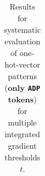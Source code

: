 \begin{table}[t]
\begin{tabular}{lllllll}

\\ \hline
\end{tabular}
\caption[Model Evaluation for only \texttt{ADP} tokens]{Results for systematic evaluation of one-hot-vector patterns (\textbf{only \texttt{ADP} tokens}) for multiple integrated gradient thresholds $t$.}
\label{tab:evalResultsADP}
\end{table}
	